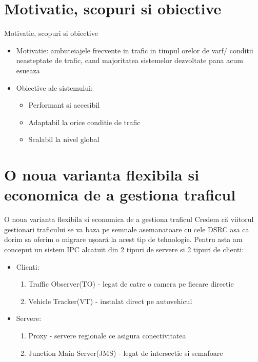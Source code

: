 \documentclass{beamer}
\begin{document}
\section{Motivatie, scopuri si obiective}
    \begin{frame}{Motivatie, scopuri si obiective}

        \begin{itemize}[<+-| alert@+>]
        \item Motivatie: ambuteiajele frecvente in trafic in timpul orelor de varf/
        conditii neasteptate de trafic, cand majoritatea sistemelor dezvoltate pana acum esueaza
        \item Obiective ale sistemului:
            \begin{itemize}
                \item Performant si accesibil
                \item Adaptabil la orice conditie de trafic
                \item Scalabil la nivel global 
            \end{itemize}
        \end{itemize}
    \end{frame}

\section{O noua varianta flexibila si economica de a gestiona traficul}
    \begin{frame}{O noua varianta flexibila si economica de a gestiona traficul}
        Credem că viitorul gestionari traficului se va baza pe semnale
        asemanatoare cu cele DSRC asa ca dorim sa oferim o migrare ușoară la 
        acest tip de tehnologie. Pentru asta am conceput un sistem IPC 
        alcatuit din 2 tipuri de servere si 2 tipuri de clienti:
        \begin{itemize}[<+-| alert@+>]
            \item Clienti:
            \begin{enumerate}
                \item Traffic Observer(TO) - legat de catre o camera pe fiecare directie
                \item Vehicle Tracker(VT) - instalat direct pe autovehicul
            \end{enumerate}
            \item Servere: 
            \begin{enumerate}
                \item  Proxy - servere regionale ce asigura conectivitatea
                \item  Junction Main Server(JMS) - legat de intersectie si semafoare
            \end{enumerate}
        \end{itemize}

    \end{frame}
\end{document}
